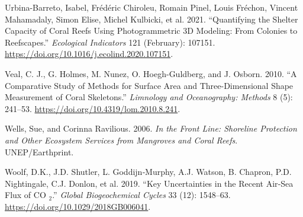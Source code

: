 \documentclass[]{article}
\begin{document}
\leavevmode\hypertarget{ref-urbina-barreto_quantifying_2021}{}%
Urbina-Barreto, Isabel, Frédéric Chiroleu, Romain Pinel, Louis Fréchon,
Vincent Mahamadaly, Simon Elise, Michel Kulbicki, et al. 2021.
``Quantifying the Shelter Capacity of Coral Reefs Using Photogrammetric
3D Modeling: From Colonies to Reefscapes.'' \emph{Ecological Indicators}
121 (February): 107151.
\url{https://doi.org/10.1016/j.ecolind.2020.107151}.

\leavevmode\hypertarget{ref-veal_comparative_2010}{}%
Veal, C. J., G. Holmes, M. Nunez, O. Hoegh-Guldberg, and J. Osborn.
2010. ``A Comparative Study of Methods for Surface Area and
Three-Dimensional Shape Measurement of Coral Skeletons.''
\emph{Limnology and Oceanography: Methods} 8 (5): 241--53.
\url{https://doi.org/10.4319/lom.2010.8.241}.

\leavevmode\hypertarget{ref-wells_front_2006}{}%
Wells, Sue, and Corinna Ravilious. 2006. \emph{In the Front Line:
Shoreline Protection and Other Ecosystem Services from Mangroves and
Coral Reefs}. UNEP/Earthprint.

\leavevmode\hypertarget{ref-woolf_key_2019}{}%
Woolf, D.K., J.D. Shutler, L. Goddijn‐Murphy, A.J. Watson, B. Chapron,
P.D. Nightingale, C.J. Donlon, et al. 2019. ``Key Uncertainties in the
Recent Air‐Sea Flux of CO \(_{\textrm{2}}\).'' \emph{Global
Biogeochemical Cycles} 33 (12): 1548--63.
\url{https://doi.org/10.1029/2018GB006041}.
\end{document}
